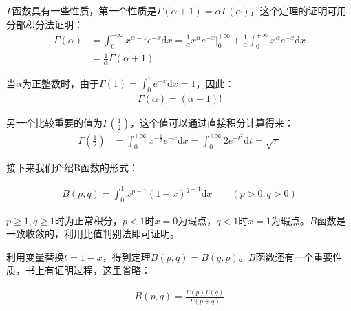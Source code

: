 \documentclass{ctexart}
\begin{document}
\begin{tcolorbox}[
    colback=bac1,     %
    colframe=fra1,   %
    coltitle=white,             %
    coltext=tex1,
    title=$\Gamma$函数的性质,
    fonttitle=\bfseries,        %
    arc=3mm                     %
]
$\Gamma$函数具有一些性质，第一个性质是$\Gamma(\alpha+1)=\alpha\Gamma(\alpha)$，这个定理的证明可用分部积分法证明：
\begin{align*}
    \Gamma(\alpha)&=\int_0^{+\infty}x^{\alpha-1}e^{-x}\mathrm{d}x=\frac{1}{\alpha} x^\alpha e^{-x}|_0^{+\infty}
+\frac{1}{\alpha} \int_0^{+\infty}x^{\alpha}e^{-x}\mathrm{d}x\\
&=\frac{1}{\alpha}\Gamma(\alpha+1) 
\end{align*}

当$\alpha$为正整数时，由于$\Gamma(1)=\int_0^1 e^{-x}\mathrm{d}x=1$，因此：
\begin{align*}
    \Gamma(\alpha)=(\alpha-1)!
\end{align*}

另一个比较重要的值为$\Gamma(\frac{1}{2})$，这个值可以通过直接积分计算得来：
\begin{align*}
 \Gamma(\frac{1}{2})&=\int_0^{+\infty}x^{-\frac{1}{2} }e^{-x}\mathrm{d}x=\int_0^{+\infty}2e^{-t^2}
\mathrm{d}t=\sqrt{\pi}    
\end{align*}
\end{tcolorbox}


接下来我们介绍B函数的形式：
\begin{tcolorbox}[
    colback=bac1,     %
    colframe=fra1,   %
    coltitle=white,             %
    coltext=tex1,
    title=$B$函数的定义,
    fonttitle=\bfseries,        %
    arc=3mm                     %
]
\begin{align*}
    B(p,q)=\int_0^1 x^{p-1}(1-x)^{q-1}\mathrm{d}x\qquad (p>0,q>0)
\end{align*}
\end{tcolorbox}

$p\geq 1,q\geq 1$时为正常积分，$p<1$时$x=0$为瑕点，$q<1$时$x=1$为瑕点。$B$函数是一致收敛的，利用比值判别法即可证明。

利用变量替换$t=1-x$，得到定理$B(p,q)=B(q,p)$。$B$函数还有一个重要性质，书上有证明过程，这里省略：
\begin{tcolorbox}[
    colback=bac1,     %
    colframe=fra1,   %
    coltitle=white,             %
    coltext=tex1,
    title=$B$函数的性质,
    fonttitle=\bfseries,        %
    arc=3mm                     %
]
\begin{align*}
    B(p,q)=\frac{\Gamma(p)\Gamma(q)}{\Gamma(p+q)}
\end{align*}
\end{tcolorbox}
\end{document}
